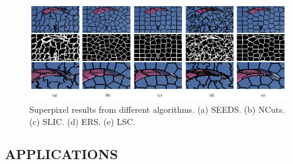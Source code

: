 \begin{figure}[htbp]
    \centering
    \includegraphics[width = 1 \linewidth]{images/paper2/superpixelsComparison.png}
    \centering
    \caption{Superpixel results from different algorithms. (a) SEEDS. (b) NCuts. (c) SLIC. (d) ERS. (e) LSC.}
    \label{fig: superpixelsComparison}
\end{figure}

\subsection{APPLICATIONS}
